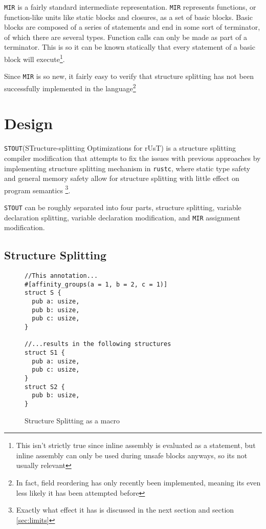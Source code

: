 \documentclass[12pt,oneside]{book}
\newcommand{\rustcname}{{\texttt{rustc}}}
\def \rustc {\rustcname{}\xspace}
\newcommand{\mirname}{{\texttt{MIR}}}
\def \mir {\mirname{}\xspace}
\newcommand{\projectname}{{\texttt{STOUT}}}
\def \name{\projectname\xspace}
\begin{document}
\mir is a fairly standard intermediate representation. \mir represents functions, 
or function-like units like static blocks and closures, 
as a set of basic blocks. Basic blocks are composed of a series of statements
and end in some sort of terminator, of which there are several types. 
Function calls can only be made as part of a terminator. This is
so it can be known statically that every statement of a basic block will
execute\footnote{This isn't strictly true since inline assembly is evaluated as
  a statement, but inline assembly can only be used during unsafe blocks
  anyways, so its not usually relevant}.

  Since \mir is so new, it fairly easy to verify that structure splitting has
  not been successfully implemented in the language\footnote{In fact, field
  reordering has only recently been implemented, meaning its even less
  likely it has been attempted before}

\chapter{Design}

\name (STructure-splitting Optimizations for rUsT) is a structure 
splitting compiler modification that attempts to fix the issues with
previous approaches by implementing structure splitting 
mechanism in \rustc, where static type
safety and general memory safety allow for 
structure splitting with little effect on program
semantics
\footnote{Exactly what effect it has is discussed in the next section and section \ref{sec:limits}}.

\name can be roughly separated into 
four parts, 
structure splitting, 
variable declaration splitting,
variable declaration modification,
and 
\mir assignment modification.

\section{Structure Splitting}

\begin{figure}
\begin{verbatim}
//This annotation...
#[affinity_groups(a = 1, b = 2, c = 1)]
struct S {
  pub a: usize,
  pub b: usize,
  pub c: usize,
}

//...results in the following structures
struct S1 {
  pub a: usize,
  pub c: usize,
}
struct S2 {
  pub b: usize,
}
\end{verbatim}
  \caption{Structure Splitting as a macro}
  \label{fig:split}
\end{figure}
\end{document}

